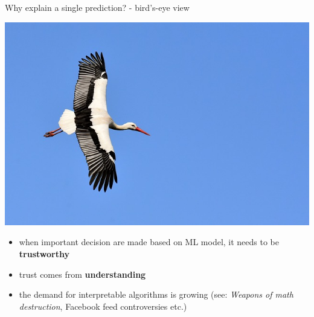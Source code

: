 \documentclass[xcolor={dvipsnames}]{beamer}
\begin{document}
	\begin{frame}{Why explain a single prediction? - bird's-eye view}
		
		\includegraphics[scale=0.85]{ilustracje_erum/bird.jpg}
		
		\begin{itemize}
			
			\item when important decision are made based on ML model, it needs to be \textbf{trustworthy}
			
			\item trust comes from \textbf{understanding}
			
			\item the demand for interpretable algorithms is growing
			(see: \textit{Weapons of math destruction}, Facebook feed controversies etc.)
		\end{itemize}
	\end{frame}
\end{document}
